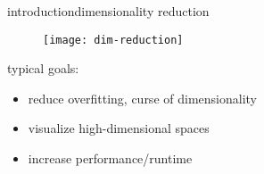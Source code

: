 \begin{frame}{introduction}{dimensionality reduction}
	
		\begin{figure}
			\texttt{[image: dim-reduction]}
		\end{figure}

		typical goals:
		\begin{itemize}
				\item reduce overfitting, curse of dimensionality
				\item visualize high-dimensional spaces
				\item increase performance/runtime
		\end{itemize}

\end{frame}

